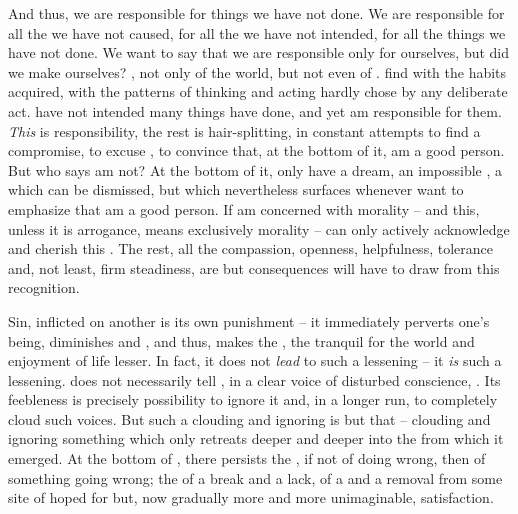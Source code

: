 {{\pa And thus, we are responsible for things we have not done.  We are
responsible for all the  we have not caused, for all the
 we have not intended, for all the things we have not done. 
We want to say that we are responsible only for ourselves, but did we
make ourselves?  , not only of the world, but
not even of .  find  with the habits 
 acquired, with the patterns of thinking and acting  
hardly chose by any deliberate act.  have not intended many 
things  have done, and yet  am responsible for them.
{\em This} is responsibility, the rest is hair-splitting, in constant 
attempts to find a compromise, to excuse , to convince 
 that, at the bottom of it,  am a good person. But 
who says  am not? At the bottom of it,  only have a 
 dream, an impossible , a  which can be 
dismissed, but which nevertheless surfaces whenever  want to 
emphasize that  am a good person. If  am concerned with  
morality -- and this, unless it is arrogance, means exclusively  
morality --  can only actively acknowledge and 
cherish this . The rest, all the compassion, openness, 
helpfulness, tolerance and, not least, firm steadiness, are but 
consequences  will have to draw from this recognition.





\pa Sin,  inflicted on another is its own punishment -- it
immediately perverts one's being, diminishes  and
, and thus, makes the , the tranquil 
 for the world and enjoyment of life lesser. In 
fact, it does not {\em lead} to such a lessening -- it {\em is} such 
a lessening. 
 does not necessarily tell , in a clear voice 
of disturbed conscience, . Its feebleness 
is precisely  possibility to ignore it and, in a longer run, to 
completely cloud such voices. But such a clouding and ignoring is but 
that -- clouding and ignoring something which only retreats deeper and 
deeper into the  from which it  
emerged. At the bottom of , there persists the 
, if not of  doing wrong, then of something 
going wrong; the  of a break and a lack, of a 
 and
a removal from some  site of hoped for but, now 
gradually more and more unimaginable, satisfaction. 

}}
